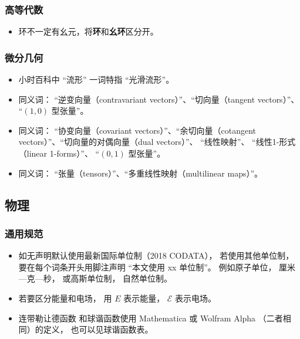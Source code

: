 \subsubsection{高等代数}
\begin{itemize}
\item 环不一定有幺元，将\textbf{环}和\textbf{幺环}区分开。
\end{itemize}


\subsubsection{微分几何}
\begin{itemize}
\item 小时百科中 “流形” 一词特指 “光滑流形”。
\item 同义词： “逆变向量（contravariant vectors）”、“切向量（tangent vectors）”、 “$(1, 0)$ 型张量”。
\item 同义词： “协变向量（covariant vectors）”、“余切向量（cotangent vectors）”、“切向量的对偶向量（dual vectors）”、 “线性映射”、 “线性1-形式（linear 1-forms）”、 “$(0, 1)$ 型张量”。
\item 同义词： “张量（tensors）”、“多重线性映射（multilinear maps）”。
\end{itemize}

\subsection{物理}
\subsubsection{通用规范}
\begin{itemize}
\item 如无声明默认使用最新国际单位制（2018 CODATA）， 若使用其他单位制， 要在每个词条开头用脚注声明 “本文使用 xx 单位制”。 例如原子单位， 厘米—克—秒， 或高斯单位制， 自然单位制。
\item 若要区分能量和电场， 用 $E$ 表示能量， $\mathcal E$ 表示电场。
\item 连带勒让德函数 和球谐函数使用 Mathematica 或 Wolfram Alpha （二者相同）的定义， 也可以见球谐函数表。
\end{itemize}

